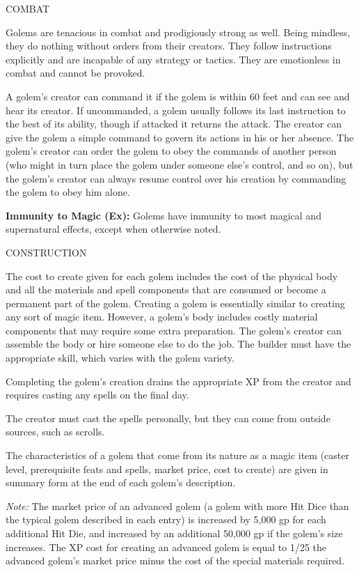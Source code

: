 \documentclass{article}
\begin{document}
COMBAT

Golems are tenacious in combat and prodigiously strong as well. Being mindless, 
they do nothing without orders from their creators. They follow instructions explicitly 
and are incapable of any strategy or tactics. They are emotionless in combat and 
cannot be provoked.

A golem's creator can command it if the golem is within 60 feet and can see and 
hear its creator. If uncommanded, a golem usually follows its last instruction 
to the best of its ability, though if attacked it returns the attack. The creator 
can give the golem a simple command to govern its actions in his or her absence. 
The golem's creator can order the golem to obey the commands of another person 
(who might in turn place the golem under someone else's control, and so on), but 
the golem's creator can always resume control over his creation by commanding the 
golem to obey him alone.

\textbf{Immunity to Magic (Ex):} Golems have immunity to most magical and supernatural 
effects, except when otherwise noted.

CONSTRUCTION

The cost to create given for each golem includes the cost of the physical body 
and all the materials and spell components that are consumed or become a permanent 
part of the golem. Creating a golem is essentially similar to creating any sort 
of magic item. However, a golem's body includes costly material components that 
may require some extra preparation. The golem's creator can assemble the body or 
hire someone else to do the job. The builder must have the appropriate skill, which 
varies with the golem variety.

Completing the golem's creation drains the appropriate XP from the creator and 
requires casting any spells on the final day.

The creator must cast the spells personally, but they can come from outside sources, 
such as scrolls.

The characteristics of a golem that come from its nature as a magic item (caster 
level, prerequisite feats and spells, market price, cost to create) are given in 
summary form at the end of each golem's description.

\textit{Note: }The market price of an advanced golem (a golem with more Hit Dice 
than the typical golem described in each entry) is increased by 5,000 gp for each 
additional Hit Die, and increased by an additional 50,000 gp if the golem's size 
increases. The XP cost for creating an advanced golem is equal to 1/25 the advanced 
golem's market price minus the cost of the special materials required.
\end{document}
